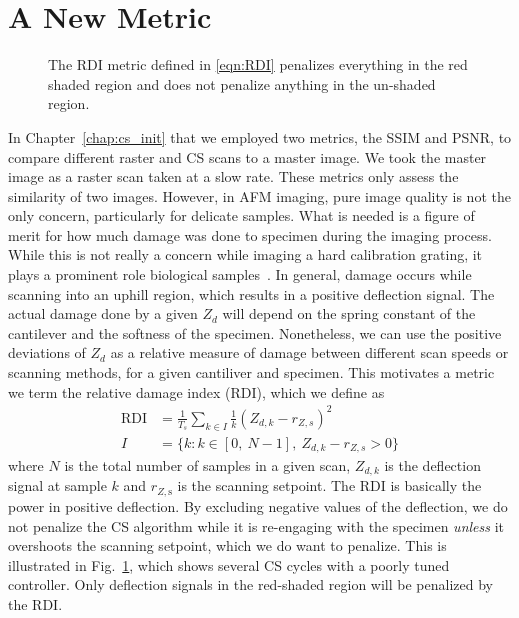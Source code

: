 \documentclass[twocolumn,twoside]{IEEEtran/IEEEtran}
\begin{document}
\section{A New Metric}\label{sec:rdi}
\begin{figure}[t!]
  \centering
  
  \caption{The RDI metric defined in \eqref{eqn:RDI} penalizes everything in the
    red shaded region and does not penalize anything in the un-shaded region.}
  \label{fig:damage_illustrate}
\end{figure}
In Chapter~\ref{chap:cs_init} that we employed two metrics, the SSIM and PSNR,
to compare different raster and CS scans to a master image. We took the master
image as a raster scan taken at a slow rate. These metrics only assess the
similarity of two images. However, in AFM imaging, pure image quality is not the
only concern, particularly for delicate samples. What is needed is a figure of
merit for how much damage was done to specimen during the imaging process. While
this is not really a concern while imaging a hard calibration grating, it plays
a prominent role biological samples~\cite{ando_highspeed_2008}. In general,
damage occurs while scanning into an uphill region, which results in a positive
deflection signal. The actual damage done by a given $Z_d$ will depend on the
spring constant of the cantilever and the softness of the specimen. Nonetheless,
we can use the positive deviations of $Z_d$ as a relative measure of damage
between different scan speeds or scanning methods, for a given cantiliver and
specimen. This motivates a metric we term the relative damage index (RDI), which
we define as
\begin{align}
  \text{RDI} &= \frac{1}{T_s}\sum_{k\in I} \frac{1}{k} \left(Z_{d,k} - r_{Z,s}\right)^2 \label{eqn:RDI}\\
  I &= \{k: k\in[0,~N-1],~ Z_{d,k}-r_{Z,s} > 0 \} \nonumber
\end{align}
where $N$ is the total number of samples in a given scan, $Z_{d,k}$ is the
deflection signal at sample $k$ and $r_{Z,\textrm{s}}$ is the scanning setpoint.
The RDI is basically the power in positive deflection. By excluding negative
values of the deflection, we do not penalize the CS algorithm while it is
re-engaging with the specimen \emph{unless} it overshoots the scanning setpoint,
which we do want to penalize. This is illustrated in
Fig.~\ref{fig:damage_illustrate}, which shows several CS cycles with a poorly
tuned controller. Only deflection signals in the red-shaded region will be
penalized by the RDI.
\end{document}
